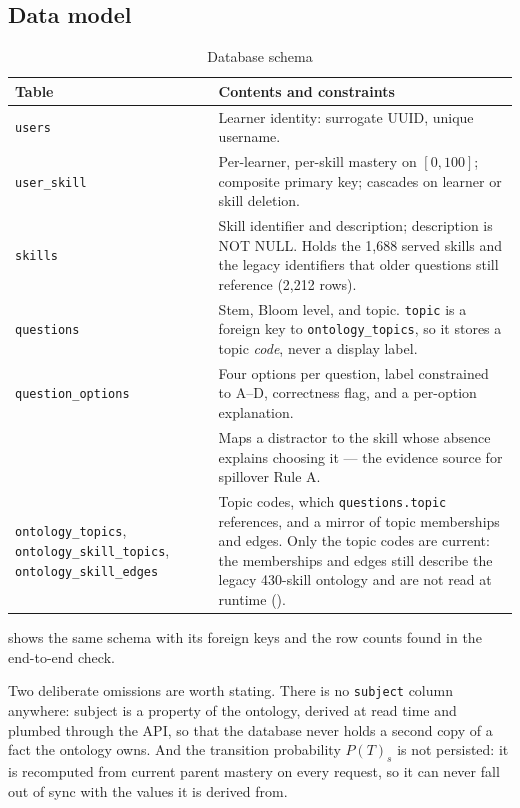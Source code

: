 \subsection{Data model}

\begin{table}[htbp]
  \centering
  \caption{Database schema}
  \label{tab:schema}
  \begin{tabularx}{\textwidth}{>{\hsize}Y>{\hsize}Y}
    \toprule
    Table & Contents and constraints \\
    \midrule
    \texttt{users} & Learner identity: surrogate UUID, unique username. \\
    \texttt{user\_skill} & Per-learner, per-skill mastery on $[0,100]$; composite primary key; cascades on learner or skill deletion. \\
    \texttt{skills} & Skill identifier and description; description is NOT NULL. Holds the 1{,}688 served skills and the legacy identifiers that older questions still reference (2{,}212 rows). \\
    \texttt{questions} & Stem, Bloom level, and topic. \texttt{topic} is a foreign key to \texttt{ontology\_topics}, so it stores a topic \emph{code}, never a display label. \\
    \texttt{question\_options} & Four options per question, label constrained to A--D, correctness flag, and a per-option explanation. \\
     & Maps a distractor to the skill whose absence explains choosing it --- the evidence source for spillover Rule A. \\
    \texttt{ontology\_topics}, \texttt{ontology\_skill\_topics}, \texttt{ontology\_skill\_edges} & Topic codes, which \texttt{questions.topic} references, and a mirror of topic memberships and edges. Only the topic codes are current: the memberships and edges still describe the legacy 430-skill ontology and are not read at runtime (). \\
    \bottomrule
  \end{tabularx}
\end{table}

 shows the same schema with its foreign keys and the row counts
found in the end-to-end check.



Two deliberate omissions are worth stating. There is no \texttt{subject} column
anywhere: subject is a property of the ontology, derived at read time and
plumbed through the API, so that the database never holds a second copy of a
fact the ontology owns. And the transition probability $P(T)_s$ is not
persisted: it is recomputed from current parent mastery on every request, so it
can never fall out of sync with the values it is derived from.

